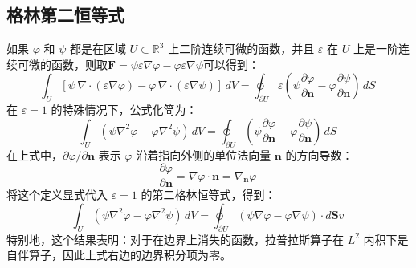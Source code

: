 \subsection{格林第二恒等式}
如果 $\varphi$ 和 $\psi$ 都是在区域 $U \subset \mathbb{R}^3$ 上二阶连续可微的函数，并且 $\varepsilon$ 在 $U$ 上是一阶连续可微的函数，则取$\mathbf{F} = \psi \varepsilon \nabla \varphi - \varphi \varepsilon \nabla \psi$可以得到：
$$
\int_U \left[\psi \,\nabla \cdot (\varepsilon \nabla \varphi) - \varphi \,\nabla \cdot (\varepsilon \nabla \psi)\right]\, dV
=
\oint_{\partial U} \varepsilon \left(\psi \frac{\partial \varphi}{\partial \mathbf{n}} - \varphi \frac{\partial \psi}{\partial \mathbf{n}}\right)\, dS~
$$
在 $\varepsilon = 1$ 的特殊情况下，公式化简为：
$$
\int_U \left(\psi \nabla^2 \varphi - \varphi \nabla^2 \psi\right) \, dV
=
\oint_{\partial U} \left(\psi \frac{\partial \varphi}{\partial \mathbf{n}} - \varphi \frac{\partial \psi}{\partial \mathbf{n}}\right) \, dS~
$$
在上式中，$\displaystyle \partial \varphi/\partial \mathbf{n}$ 表示 $\varphi$ 沿着指向外侧的单位法向量 $\mathbf{n}$ 的方向导数：
$$
\frac{\partial \varphi}{\partial \mathbf{n}}
= \nabla \varphi \cdot \mathbf{n}
= \nabla_{\mathbf{n}} \varphi~
$$
将这个定义显式代入 $\varepsilon = 1$ 的第二格林恒等式，得到：
$$
\int_U \left(\psi \nabla^2 \varphi - \varphi \nabla^2 \psi\right) \, dV
=
\oint_{\partial U} \left(\psi \nabla \varphi - \varphi \nabla \psi\right) \cdot d\mathbf{S}v~
$$
特别地，这个结果表明：对于在边界上消失的函数，拉普拉斯算子在 $L^2$ 内积下是自伴算子，因此上式右边的边界积分项为零。
